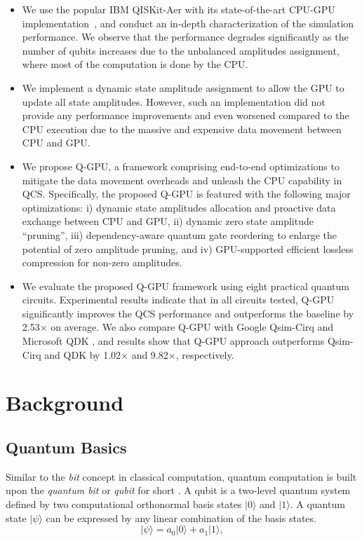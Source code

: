 \begin{itemize}
\item We use the popular IBM QISKit-Aer with its state-of-the-art CPU-GPU implementation~\cite{10.5281/zenodo.2562111}, and conduct an in-depth characterization of the simulation performance. We observe that the performance degrades significantly as the number of qubits increases due to the unbalanced amplitudes assignment, where most of the computation is done by the CPU. 
\item We implement a dynamic state amplitude assignment to allow the GPU to update all state amplitudes. However, such an implementation did not provide any performance improvements and even worsened compared to the CPU execution due to the massive and expensive data movement between CPU and GPU.
\item We propose Q-GPU, a framework comprising end-to-end optimizations to mitigate the data movement overheads and unleash the CPU capability in QCS. Specifically, the proposed Q-GPU is featured with the following major optimizations:
i) dynamic state amplitudes allocation and proactive data exchange between CPU and GPU, ii) dynamic zero state amplitude ``pruning'', iii) dependency-aware quantum gate reordering to enlarge the potential of zero amplitude pruning, and iv) GPU-supported efficient lossless compression for non-zero amplitudes.
\item We evaluate the proposed Q-GPU framework using eight practical quantum circuits. Experimental results indicate that in all circuits tested, Q-GPU significantly improves the QCS performance and outperforms the baseline by 2.53$\times$ on average. We also compare Q-GPU with Google Qsim-Cirq \cite{10.5281/zenodo.4023103} and Microsoft QDK \cite{msqdk}, and results show that Q-GPU approach outperforms Qsim-Cirq and QDK by 1.02$\times$ and 9.82$\times$, respectively.
\end{itemize}
 

\section{Background}
\label{section-2}
\subsection{Quantum Basics}

Similar to the \textit{bit} concept in classical computation, quantum computation is built upon the \textit{quantum bit} or \textit{qubit} for short \cite{nielsen_chuang_2010}. A qubit is a two-level quantum system defined by two computational orthonormal basis states $|0\rangle$ and $|1\rangle$. A quantum state $|\psi\rangle$ can be expressed by any linear combination of the basis states. 
\setlength{\abovedisplayskip}{1pt}
\setlength{\belowdisplayskip}{1pt}
\begin{equation}%
|\psi\rangle = a_0|0\rangle + a_1|1\rangle,
\label{eq-1}
\end{equation}

